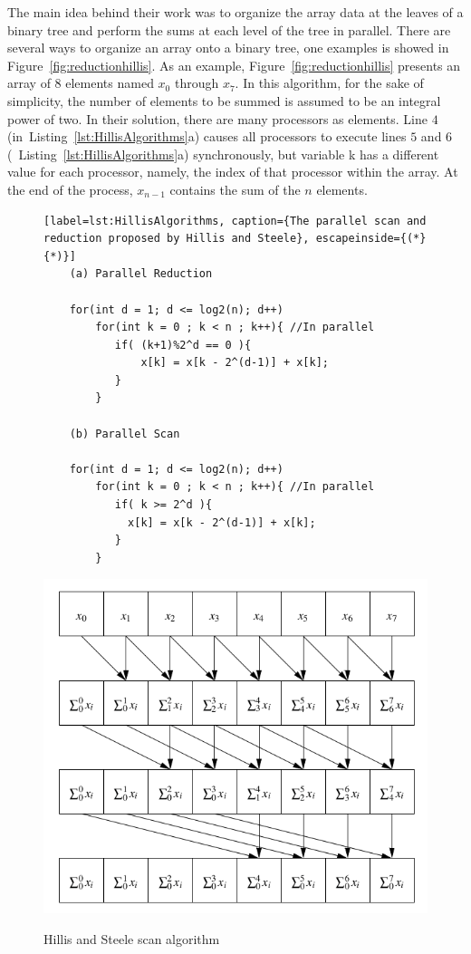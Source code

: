 \documentclass[Ingles]{ic-tese-v1}
\newcommand{\rfig}[1]{Figure~\ref{fig:#1}}
\newcommand{\rlsts}[2]{Listing~\ref{lst:#1}{#2}}
\begin{document}
The main idea behind their work was to organize the array data at the leaves of a
binary tree and perform the sums at each level of the tree in parallel. There are several ways to organize an array onto a binary tree, one examples is showed in  \rfig{reductionhillis}. As an example, \rfig{reductionhillis} presents an array of 8 elements named $x_{0}$ through $x_{7}$. In this algorithm, for the sake of simplicity, the number of elements to be summed is assumed to be an integral power of two. In their solution, there are many processors as elements. Line $4$ (in~\rlsts{HillisAlgorithms}{a}) causes all processors to execute lines $5$ and $6$ (~\rlsts{HillisAlgorithms}{a}) synchronously, but variable k has a different value for each processor, namely, the index of that processor within the array. At the end of the process, $x_{n-1}$ contains the sum of the $n$ elements.


\begin{figure}[t]
	\lstset{basicstyle=\scriptsize}
	\begin{lstlisting}[label=lst:HillisAlgorithms, caption={The parallel scan and reduction proposed by Hillis and Steele}, escapeinside={(*}{*)}]
	(a) Parallel Reduction

	for(int d = 1; d <= log2(n); d++)
	    for(int k = 0 ; k < n ; k++){ //In parallel
	       if( (k+1)%2^d == 0 ){
	           x[k] = x[k - 2^(d-1)] + x[k];
	       }
	    }

	(b) Parallel Scan

	for(int d = 1; d <= log2(n); d++)
	    for(int k = 0 ; k < n ; k++){ //In parallel
	       if( k >= 2^d ){
	         x[k] = x[k - 2^(d-1)] + x[k];
	       }
	    }

	\end{lstlisting}
\end{figure}

\begin{figure}[h]
	\centering
	\caption{Hillis and  Steele scan algorithm}
	\includegraphics[scale=0.5]{images/hillisscan.png}
	\label{fig:scanhillis}
\end{figure}
\end{document}
